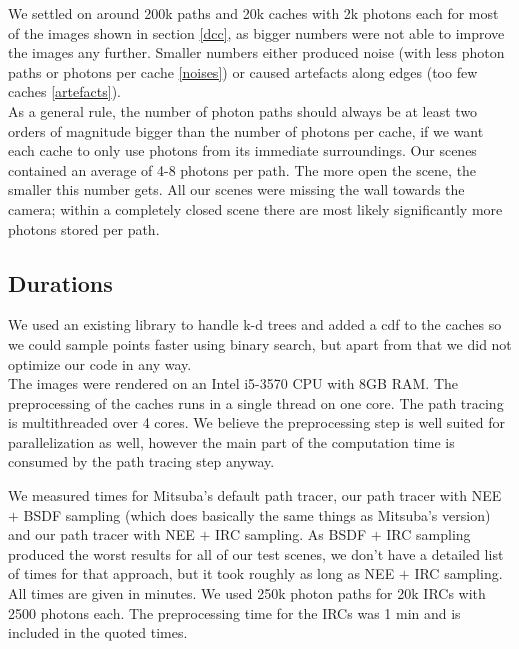 We settled on around 200k paths and 20k caches with 2k photons each for most of the images shown in section \ref{dcc}, as bigger numbers were not able to improve the images any further. Smaller numbers either produced noise (with less photon paths or photons per cache \ref{noises}) or caused artefacts along edges (too few caches \ref{artefacts}).\\
As a general rule, the number of photon paths should always be at least two orders of magnitude bigger than the number of photons per cache, if we want each cache to only use photons from its immediate surroundings. Our scenes contained an average of 4-8 photons per path. The more open the scene, the smaller this number gets. All our scenes were missing the wall towards the camera; within a completely closed scene there are most likely significantly more photons stored per path.




\subsection{Durations}
\label{durations}

We used an existing library to handle k-d trees and added a cdf to the caches so we could sample points faster using binary search, but apart from that we did not optimize our code in any way.\\
The images were rendered on an Intel i5-3570 CPU with 8GB RAM. The preprocessing of the caches runs in a single thread on one core. The path tracing is multithreaded over 4 cores. We believe the preprocessing step is well suited for parallelization as well, however the main part of the computation time is consumed by the path tracing step anyway.


We measured times for Mitsuba's default path tracer, our path tracer with NEE $+$ BSDF sampling (which does basically the same things as Mitsuba's version) and our path tracer with NEE $+$ IRC sampling. As BSDF $+$ IRC sampling produced the worst results for all of our test scenes, we don't have a detailed list of times for that approach, but it took roughly as long as NEE $+$ IRC sampling.\\
All times are given in minutes. We used 250k photon paths for 20k IRCs with 2500 photons each. The preprocessing time for the IRCs was 1 min and is included in the quoted times.

